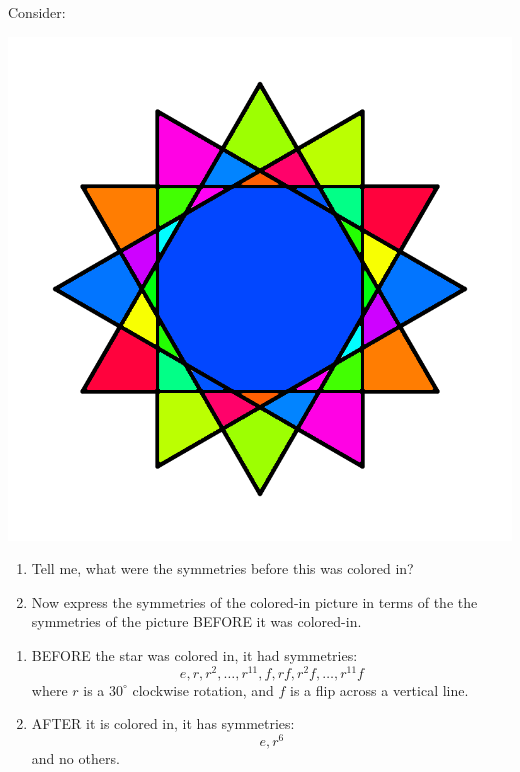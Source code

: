 \documentclass[noauthor,nooutcomes,hints]{ximera}
\begin{document}
\begin{question}
  Consider: 
 \begin{center}
  \includegraphics[width=.6\textwidth]{qR2D12.png}
 \end{center}
 \begin{enumerate}
 \item Tell me, what were the symmetries before this was colored in?
 \item Now express the symmetries of the colored-in picture in terms
    of the the symmetries of the picture BEFORE it was colored-in.
 \end{enumerate}
 \begin{freeResponse}
    \begin{enumerate}
    \item BEFORE the star was colored in, it had symmetries:
      \[
      e,r,r^2,\dots,r^{11}, f, rf,r^2f, \dots, r^{11}f
      \]
      where $r$ is a $30^\circ$ clockwise rotation, and $f$ is a flip
      across a vertical line.
    \item AFTER it is colored in, it has symmetries:
      \[
      e,r^6
      \]
      and no others.
    \end{enumerate}
  \end{freeResponse}
\end{question}
\mynewpage
\end{document}
